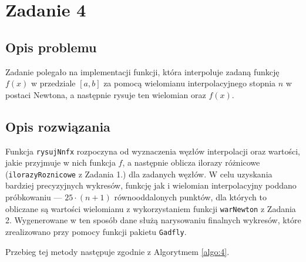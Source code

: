 \documentclass{classrep}
\begin{document}
\section{Zadanie 4}
	\subsection{Opis problemu}
		Zadanie polegało na implementacji funkcji, która interpoluje zadaną funkcję $f(x)$ w przedziale $[a,b]$ za pomocą wielomianu interpolacyjnego stopnia $n$ w postaci Newtona, a następnie rysuje ten wielomian oraz $f(x)$.

	\subsection{Opis rozwiązania}
		Funkcja \texttt{rysujNnfx} rozpoczyna od wyznaczenia węzłów interpolacji oraz wartości, jakie przyjmuje w nich funkcja $f$, a następnie oblicza ilorazy różnicowe (\texttt{ilorazyRoznicowe} z Zadania 1.) dla zadanych węzłów. W celu uzyskania bardziej precyzyjnych wykresów, funkcję jak i wielomian interpolacyjny poddano próbkowaniu --- $25\cdot (n+1)$ równooddalonych punktów, dla których to obliczane są wartości wielomianu z wykorzystaniem funkcji \texttt{warNewton} z Zadania 2. Wygenerowane w ten sposób dane służą narysowaniu finalnych wykresów, które zrealizowano przy pomocy funkcji pakietu \texttt{Gadfly}.
		
		Przebieg tej metody następuje zgodnie z Algorytmem \ref{algo:4}.
		
\end{document}
